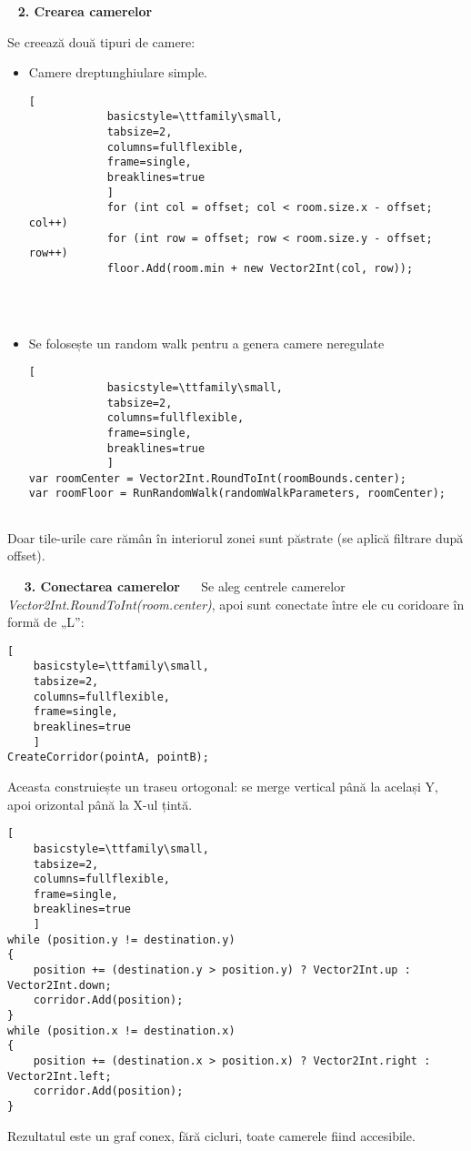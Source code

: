 \documentclass{article}
\begin{document}
	 \newline
		\textbf{2. Crearea camerelor}
	
	Se creează două tipuri de camere:
	\begin{itemize}
		\item 	Camere dreptunghiulare simple.
		\lstset{style=sharpc}	
		\begin{lstlisting}[
			basicstyle=\ttfamily\small, 
			tabsize=2, 
			columns=fullflexible,
			frame=single,
			breaklines=true
			]
			for (int col = offset; col < room.size.x - offset; col++)
			for (int row = offset; row < room.size.y - offset; row++)
			floor.Add(room.min + new Vector2Int(col, row));
			
			
			
		\end{lstlisting}
		\item Se folosește un random walk pentru a genera camere neregulate
				\lstset{style=sharpc}	
		\begin{lstlisting}[
			basicstyle=\ttfamily\small, 
			tabsize=2, 
			columns=fullflexible,
			frame=single,
			breaklines=true
			]
var roomCenter = Vector2Int.RoundToInt(roomBounds.center);
var roomFloor = RunRandomWalk(randomWalkParameters, roomCenter);
		
		\end{lstlisting}
	\end{itemize}
	\tab Doar tile-urile care rămân în interiorul zonei sunt păstrate (se aplică filtrare după offset).
	
	 \newline
	 \textbf{3. Conectarea camerelor} \newline
	 
	 \tab Se aleg centrele camerelor \textit{Vector2Int.RoundToInt(room.center)}, apoi sunt conectate între ele cu coridoare în formă de „L”:
	 
	 
				\lstset{style=sharpc}	
\begin{lstlisting}[
	basicstyle=\ttfamily\small, 
	tabsize=2, 
	columns=fullflexible,
	frame=single,
	breaklines=true
	]
CreateCorridor(pointA, pointB);
\end{lstlisting}
\newpage
Aceasta construiește un traseu ortogonal: se merge vertical până la același Y, apoi orizontal până la X-ul țintă.
				\lstset{style=sharpc}	
\begin{lstlisting}[
	basicstyle=\ttfamily\small, 
	tabsize=2, 
	columns=fullflexible,
	frame=single,
	breaklines=true
	]
while (position.y != destination.y)
{
	position += (destination.y > position.y) ? Vector2Int.up : Vector2Int.down;
	corridor.Add(position);
}
while (position.x != destination.x)
{
	position += (destination.x > position.x) ? Vector2Int.right : Vector2Int.left;
	corridor.Add(position);
}

\end{lstlisting}
\tab Rezultatul este un graf conex, fără cicluri, toate camerele fiind accesibile.
\end{document}
